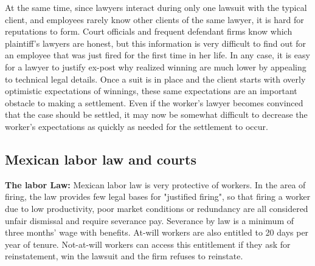 \documentclass[11pt]{article}
\begin{document}
At the same time, since lawyers interact during only one lawsuit with the typical client, and employees rarely know other clients of the same lawyer, it is hard for reputations to form. Court officials and frequent defendant firms know which plaintiff's lawyers are honest, but this information is very difficult to find out for an employee that was just fired for the first time in her life. In any case, it is easy for a lawyer to justify ex-post why realized winning are much lower by appealing to technical legal details. Once a suit is in place and the client starts with overly optimistic expectations of winnings, these same expectations are an important obstacle to making a settlement. Even if the worker's lawyer becomes convinced that the case should be settled, it may now be somewhat difficult to decrease the worker's expectations as quickly as needed for the settlement to occur. 


\subsection{Mexican labor law and courts}

\textbf{The labor Law:} Mexican labor law is very protective of workers. In the area of firing, the law provides few legal bases for "justified firing", so that firing a worker due to low productivity, poor market conditions or redundancy are all considered unfair dismissal and require severance pay. Severance by law is a minimum of three months' wage with benefits. At-will workers are also entitled to 20 days per year of tenure. Not-at-will workers can access this entitlement if they ask for reinstatement, win the lawsuit and the firm refuses to reinstate.

\end{document}

